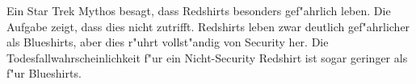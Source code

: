 \begin{diskussion}
Ein Star Trek Mythos besagt, dass Redshirts besonders gef"ahrlich
leben. Die Aufgabe zeigt, dass dies nicht zutrifft.
Redshirts leben zwar deutlich gef"ahrlicher als Blueshirts, aber
dies r"uhrt vollst"andig von Security her. Die Todesfallwahrscheinlichkeit
f"ur ein Nicht-Security Redshirt ist sogar geringer als f"ur Blueshirts.
\end{diskussion}



